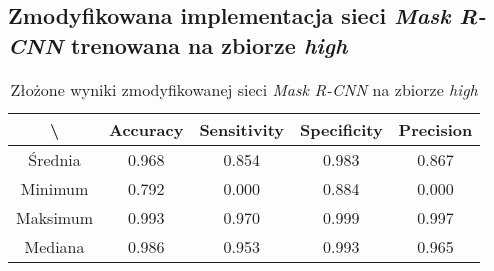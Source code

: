 \subsection{Zmodyfikowana implementacja sieci \textit{Mask R-CNN} trenowana na zbiorze \textit{high}}

\begin{table}[H]
	\centering
	\caption{Złożone wyniki zmodyfikowanej sieci \textit{Mask R-CNN} na zbiorze \textit{high}}
	\vspace{6pt}
	{\footnotesize
		\begin{tabular}{|c|c|c|c|c|}
      \hline \textbackslash & Accuracy & Sensitivity & Specificity & Precision \\
      \hline Średnia & 0.968 & 0.854 & 0.983 & 0.867 \\
      \hline Minimum & 0.792 & 0.000 & 0.884 & 0.000 \\
      \hline Maksimum & 0.993 & 0.970 & 0.999 & 0.997 \\
      \hline Mediana & 0.986 & 0.953 & 0.993 & 0.965 \\
      \hline
		\end{tabular}
	}
  \vspace{0pt}
  \label{Tab:high_modified_calculated}
\end{table}

